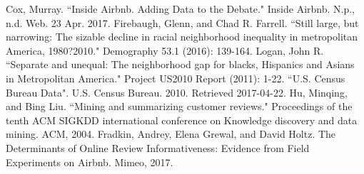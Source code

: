 \documentclass[11pt, oneside]{article}
\begin{document}
\begin{thebibliography}{16}
Cox, Murray. ``Inside Airbnb. Adding Data to the Debate." Inside Airbnb. N.p., n.d. Web. 23 Apr. 2017.
Firebaugh, Glenn, and Chad R. Farrell. ``Still large, but narrowing: The sizable decline in racial neighborhood inequality in metropolitan America, 1980?2010." Demography 53.1 (2016): 139-164.
Logan, John R. ``Separate and unequal: The neighborhood gap for blacks, Hispanics and Asians in Metropolitan America." Project US2010 Report (2011): 1-22.
``U.S. Census Bureau Data". U.S. Census Bureau. 2010. Retrieved 2017-04-22.
Hu, Minqing, and Bing Liu. ``Mining and summarizing customer reviews." Proceedings of the tenth ACM SIGKDD international conference on Knowledge discovery and data mining. ACM, 2004.
Fradkin, Andrey, Elena Grewal, and David Holtz. The Determinants of Online Review Informativeness: Evidence from Field Experiments on Airbnb. Mimeo, 2017.
\end{thebibliography}

\end{document}
